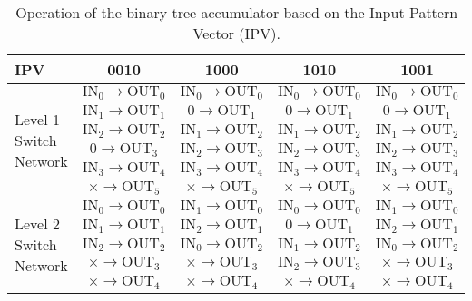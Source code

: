 \begin{table}
    \centering
    \caption{Operation of the binary tree accumulator based on the Input Pattern Vector (IPV).}
    \label{tbl:ipv}
    \begin{tabular}{m{2cm}cccc}
        IPV & 0010 & 1000 & 1010 & 1001 \\ 
        \hline
        \multirow{6}{*}{\parbox{2cm}{\centering Level 1 Switch Network}} &
        $\textrm{IN}_0 \rightarrow \textrm{OUT}_0$ &
        $\textrm{IN}_0 \rightarrow \textrm{OUT}_0$ &
        $\textrm{IN}_0 \rightarrow \textrm{OUT}_0$ &
        $\textrm{IN}_0 \rightarrow \textrm{OUT}_0$ \\
        & $\textrm{IN}_1 \rightarrow \textrm{OUT}_1$ &
        $0 \rightarrow \textrm{OUT}_1$ &
        $0 \rightarrow \textrm{OUT}_1$ &
        $0 \rightarrow \textrm{OUT}_1$ \\
        & $\textrm{IN}_2 \rightarrow \textrm{OUT}_2$ &
        $\textrm{IN}_1 \rightarrow \textrm{OUT}_2$ &
        $\textrm{IN}_1 \rightarrow \textrm{OUT}_2$ &
        $\textrm{IN}_1 \rightarrow \textrm{OUT}_2$\\
        & $0 \rightarrow \textrm{OUT}_3$ &
        $\textrm{IN}_2 \rightarrow \textrm{OUT}_3$ &
        $\textrm{IN}_2 \rightarrow \textrm{OUT}_3$ &
        $\textrm{IN}_2 \rightarrow \textrm{OUT}_3$\\
        & $\textrm{IN}_3 \rightarrow \textrm{OUT}_4$ &
        $\textrm{IN}_3 \rightarrow \textrm{OUT}_4$ &
        $\textrm{IN}_3 \rightarrow \textrm{OUT}_4$ &
        $\textrm{IN}_3 \rightarrow \textrm{OUT}_4$\\
        & $\times \rightarrow \textrm{OUT}_5$ &
        $\times \rightarrow \textrm{OUT}_5$ &
        $\times \rightarrow \textrm{OUT}_5$ &
        $\times \rightarrow \textrm{OUT}_5$\\
        \hline

        \multirow{5}{*}{\parbox{2cm}{\centering Level 2 Switch Network}} &
        $\textrm{IN}_0 \rightarrow \textrm{OUT}_0$ &
        $\textrm{IN}_1 \rightarrow \textrm{OUT}_0$ &
        $\textrm{IN}_0 \rightarrow \textrm{OUT}_0$ &
        $\textrm{IN}_1 \rightarrow \textrm{OUT}_0$\\
        & $\textrm{IN}_1 \rightarrow \textrm{OUT}_1$ &
        $\textrm{IN}_2 \rightarrow \textrm{OUT}_1$ &
        $0 \rightarrow \textrm{OUT}_1$ &
        $\textrm{IN}_2 \rightarrow \textrm{OUT}_1$\\
        & $\textrm{IN}_2 \rightarrow \textrm{OUT}_2$ &
        $\textrm{IN}_0 \rightarrow \textrm{OUT}_2$ &
        $\textrm{IN}_1 \rightarrow \textrm{OUT}_2$ &
        $\textrm{IN}_0 \rightarrow \textrm{OUT}_2$\\
        & $\times \rightarrow \textrm{OUT}_3$ &
        $\times \rightarrow \textrm{OUT}_3$ &
        $\textrm{IN}_2 \rightarrow \textrm{OUT}_3$ &
        $\times \rightarrow \textrm{OUT}_3$\\
        & $\times \rightarrow \textrm{OUT}_4$ &
        $\times \rightarrow \textrm{OUT}_4$ &
        $\times \rightarrow \textrm{OUT}_4$ &
        $\times \rightarrow \textrm{OUT}_4$\\
        \hline


\end{tabular}
\end{table}
